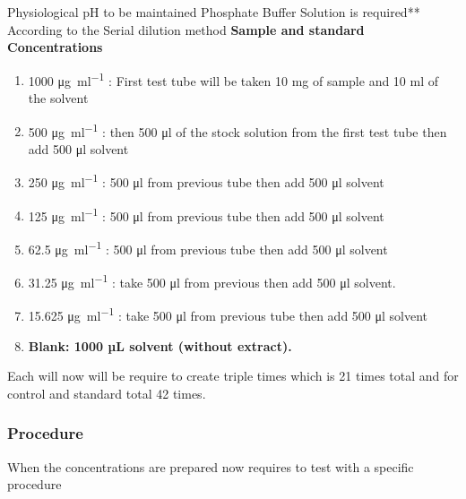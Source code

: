 \documentclass{comjnl}
\begin{document}
Physiological pH to be maintained Phosphate Buffer Solution is required**  \\
According to the Serial dilution method \textbf{Sample and standard Concentrations}
 \begin{enumerate}
     \item 1000 \unit{\micro\gram\per\milli\litre} : First test tube will be taken 10 mg of sample and 10 ml  of the solvent
   
     \item 500 \unit{\micro\gram\per\milli\litre} :  then  500 \unit{\micro\litre}  of the stock solution from the first test tube then add 500 \unit{\micro\litre} solvent 
     
     \item 250 \unit{\micro\gram\per\milli\litre}  :  500 \unit{\micro\litre} from previous tube then add 500 \unit{\micro\litre} solvent 
     
     \item 125 \unit{\micro\gram\per\milli\litre} : 500 \unit{\micro\litre} from previous tube then add 500 \unit{\micro\litre} solvent
     
     \item 62.5 \unit{\micro\gram\per\milli\litre}  : 500 \unit{\micro\litre} from previous tube then add 500 \unit{\micro\litre}  solvent
     
     \item 31.25 \unit{\micro\gram\per\milli\litre} : take 500 \unit{\micro\litre} from previous then add 500 \unit{\micro\litre} solvent.
     
     \item 15.625 \unit{\micro\gram\per\milli\litre} : take 500 \unit{\micro\litre} from previous tube then add 500 \unit{\micro\litre} solvent

     \item \textbf{Blank: 1000 µL solvent (without extract). }

 \end{enumerate}

Each will now will be require to create triple times which is 21 times total and for control and standard total 42 times.

\subsubsection{\textbf{Procedure}}
When the concentrations are prepared now requires to test with a specific procedure 
\end{document}
